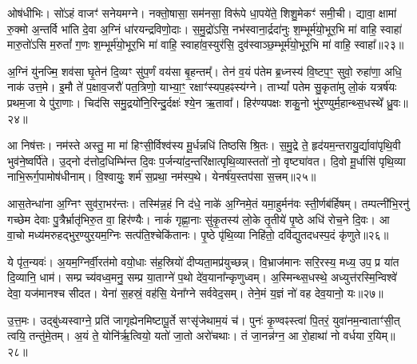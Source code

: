 ओष॑धीभिः। सो॑\-ऽहं वाजꣳ॑ सनेयमग्ने। नक्तो॒षासा॒ सम॑नसा॒ विरू॑पे धा॒पये॑ते॒ शिशु॒मेकꣳ॑ समी॒ची। द्यावा॒ क्षामा॑ रु॒क्मो अ॒न्तर्वि भा॑ति दे॒वा अ॒ग्निं धा॑रयन्द्रविणो॒दाः। स॒मु॒द्रो॑\-ऽसि॒ नभ॑स्वाना॒र्द्रदा॑नुः श॒म्भूर्म॑यो॒भूर॒भि मा॑ वाहि॒ स्वाहा॑ मारु॒तो॑\-ऽसि म॒रुतां᳚ ग॒णः श॒म्भूर्म॑यो॒भूर॒भि मा॑ वाहि॒ स्वाहा॑व॒स्युर॑सि॒ दुव॑स्वाञ्छ॒म्भूर्म॑यो॒भूर॒भि मा॑ वाहि॒ स्वाहा᳚॥२३॥

{\anuvakamend[{धने᳚ष्व॒पो दुव॑स्वाञ्छ॒म्भूर्म॑यो॒भूर॒भि मा॒ द्वे च॑॥12॥}]}

अ॒ग्निं यु॑नज्मि॒ शव॑सा घृ॒तेन॑ दि॒व्यꣳ सु॑प॒र्णं वय॑सा बृ॒हन्तम्᳚। तेन॑ व॒यं प॑तेम ब्र॒ध्नस्य॑ वि॒ष्टप॒ꣳ॒ सुवो॒ रुहा॑णा॒ अधि॒ नाक॑ उत्त॒मे। इ॒मौ ते॑ प॒क्षाव॒जरौ॑ पत॒त्रिणो॒ याभ्या॒ꣳ॒ रक्षाꣳ॑स्यप॒हꣴस्य॑ग्ने। ता\-भ्यां᳚ पतेम सु॒कृता॑मु लो॒कं यत्रर्\mbox{}ष॑यः प्रथम॒जा ये पु॑रा॒णाः। चिद॑सि समु॒द्रयो॑नि॒रिन्दु॒र्दक्षः॑ श्ये॒न ऋ॒तावा᳚। हिर॑ण्यपक्षः शकु॒नो भु॑र॒ण्युर्म॒हान्थ्स॒धस्थे᳚ ध्रु॒वः॥२४॥

आ निष॑त्तः। नम॑स्ते अस्तु॒ मा मा॑ हिꣳसी॒र्विश्व॑स्य मू॒र्धन्नधि॑ तिष्ठसि श्रि॒तः। स॒मु॒द्रे ते॒ हृद॑यम॒न्तरायु॒र्द्यावा॑पृथि॒वी भुव॑ने॒ष्वर्पि॑ते। उ॒द्नो द॑त्तोद॒धिम्भि॑न्त दि॒वः प॒र्जन्या॑द॒न्तरि॑क्षात्पृथि॒व्यास्ततो॑ नो॒ वृष्ट्या॑वत। दि॒वो मू॒र्धासि॑ पृथि॒व्या नाभि॒रूर्ग॒पामोष॑धीनाम्। वि॒श्वायुः॒ शर्म॑ स॒प्रथा॒ नम॑स्प॒थे। येनर्\mbox{}ष॑य॒स्तप॑सा स॒त्त्रम्॥२५॥

आस॒तेन्धा॑ना अ॒ग्निꣳ सुव॑रा॒भर॑न्तः। तस्मि॑न्न॒हं नि द॑धे॒ नाके॑ अ॒ग्निमे॒तं यमा॒हुर्मन॑वः स्ती॒र्णब॑र्\mbox{}हिषम्। तम्पत्नी॑भि॒रनु॑ गच्छेम देवाः पु॒त्रैर्भ्रातृ॑भिरु॒त वा॒ हिर॑ण्यैः। नाकं॑ गृह्णा॒नाः सु॑कृ॒तस्य॑ लो॒के तृ॒तीये॑ पृ॒ष्ठे अधि॑ रोच॒ने दि॒वः। आ वा॒चो मध्य॑मरुहद्भुर॒ण्युर॒यम॒ग्निः सत्प॑ति॒श्चेकि॑तानः। पृ॒ष्ठे पृ॑थि॒व्या निहि॑तो॒ दवि॑द्युतदधस्प॒दं कृ॑णुते॥२६॥

ये पृ॑त॒न्यवः॑। अ॒यम॒ग्निर्वी॒रत॑मो वयो॒धाः स॑ह॒स्रियो॑ दीप्यता॒मप्र॑युच्छन्न्। वि॒भ्राज॑मानः सरि॒रस्य॒ मध्य॒ उप॒ प्र या॑त दि॒व्यानि॒ धाम॑। सम्प्र च्य॑वध्व॒मनु॒ सम्प्र या॒ताग्ने॑ प॒थो दे॑व॒याना᳚न्कृणुध्वम्। अ॒स्मिन्थ्स॒धस्थे॒ अध्युत्त॑रस्मि॒न्विश्वे॑ देवा॒ यज॑मानश्च सीदत। येना॑ स॒हस्रं॒ वह॑सि॒ येना᳚ग्ने सर्ववेद॒सम्। तेने॒मं य॒ज्ञं नो॑ वह देव॒यानो॒ यः॥२७॥

उ॒त्त॒मः। उद्बु॑ध्यस्वाग्ने॒ प्रति॑ जागृह्येनमिष्टापू॒र्ते सꣳसृ॑जेथाम॒यं च॑। पुनः॑ कृ॒ण्वꣴस्त्वा॑ पि॒तरं॒ युवा॑नम॒न्वाताꣳ॑सी॒त् त्वयि॒ तन्तु॑मे॒तम्। अ॒यं ते॒ योनि॑र्\mbox{}ऋ॒त्वियो॒ यतो॑ जा॒तो अरो॑चथाः। तं जा॒नन्न॑ग्न॒ आ रो॒हाथा॑ नो वर्धया र॒यिम्॥२८॥

{\anuvakamend[{ध्रु॒वः स॒त्रङ्कृ॑णुते॒ यः स॒प्तत्रिꣳ॑शच्च॥13॥}]}

